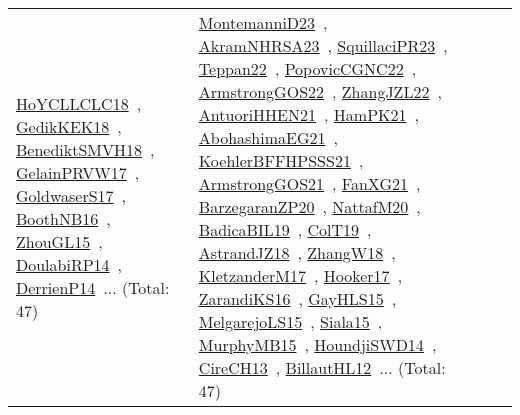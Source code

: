 {\begin{longtable}{lp{3cm}>{\raggedright\arraybackslash}p{6cm}>{\raggedright\arraybackslash}p{6cm}>{\raggedright\arraybackslash}p{8cm}}
\href{papers/HoYCLLCLC18.pdf}{HoYCLLCLC18}~\cite{HoYCLLCLC18}, \href{articles/GedikKEK18.pdf}{GedikKEK18}~\cite{GedikKEK18}, \href{papers/BenediktSMVH18.pdf}{BenediktSMVH18}~\cite{BenediktSMVH18}, \href{papers/GelainPRVW17.pdf}{GelainPRVW17}~\cite{GelainPRVW17}, \href{papers/GoldwaserS17.pdf}{GoldwaserS17}~\cite{GoldwaserS17}, \href{papers/BoothNB16.pdf}{BoothNB16}~\cite{BoothNB16}, \href{papers/ZhouGL15.pdf}{ZhouGL15}~\cite{ZhouGL15}, \href{papers/DoulabiRP14.pdf}{DoulabiRP14}~\cite{DoulabiRP14}, \href{papers/DerrienP14.pdf}{DerrienP14}~\cite{DerrienP14}... (Total: 47) & \href{articles/MontemanniD23.pdf}{MontemanniD23}~\cite{MontemanniD23}, \href{articles/AkramNHRSA23.pdf}{AkramNHRSA23}~\cite{AkramNHRSA23}, \href{papers/SquillaciPR23.pdf}{SquillaciPR23}~\cite{SquillaciPR23}, \href{papers/Teppan22.pdf}{Teppan22}~\cite{Teppan22}, \href{papers/PopovicCGNC22.pdf}{PopovicCGNC22}~\cite{PopovicCGNC22}, \href{papers/ArmstrongGOS22.pdf}{ArmstrongGOS22}~\cite{ArmstrongGOS22}, \href{papers/ZhangJZL22.pdf}{ZhangJZL22}~\cite{ZhangJZL22}, \href{papers/AntuoriHHEN21.pdf}{AntuoriHHEN21}~\cite{AntuoriHHEN21}, \href{articles/HamPK21.pdf}{HamPK21}~\cite{HamPK21}, \href{articles/AbohashimaEG21.pdf}{AbohashimaEG21}~\cite{AbohashimaEG21}, \href{articles/KoehlerBFFHPSSS21.pdf}{KoehlerBFFHPSSS21}~\cite{KoehlerBFFHPSSS21}, \href{papers/ArmstrongGOS21.pdf}{ArmstrongGOS21}~\cite{ArmstrongGOS21}, \href{articles/FanXG21.pdf}{FanXG21}~\cite{FanXG21}, \href{papers/BarzegaranZP20.pdf}{BarzegaranZP20}~\cite{BarzegaranZP20}, \href{papers/NattafM20.pdf}{NattafM20}~\cite{NattafM20}, \href{papers/BadicaBIL19.pdf}{BadicaBIL19}~\cite{BadicaBIL19}, \href{papers/ColT19.pdf}{ColT19}~\cite{ColT19}, \href{papers/AstrandJZ18.pdf}{AstrandJZ18}~\cite{AstrandJZ18}, \href{articles/ZhangW18.pdf}{ZhangW18}~\cite{ZhangW18}, \href{papers/KletzanderM17.pdf}{KletzanderM17}~\cite{KletzanderM17}, \href{papers/Hooker17.pdf}{Hooker17}~\cite{Hooker17}, \href{articles/ZarandiKS16.pdf}{ZarandiKS16}~\cite{ZarandiKS16}, \href{papers/GayHLS15.pdf}{GayHLS15}~\cite{GayHLS15}, \href{papers/MelgarejoLS15.pdf}{MelgarejoLS15}~\cite{MelgarejoLS15}, \href{articles/Siala15.pdf}{Siala15}~\cite{Siala15}, \href{papers/MurphyMB15.pdf}{MurphyMB15}~\cite{MurphyMB15}, \href{papers/HoundjiSWD14.pdf}{HoundjiSWD14}~\cite{HoundjiSWD14}, \href{papers/CireCH13.pdf}{CireCH13}~\cite{CireCH13}, \href{papers/BillautHL12.pdf}{BillautHL12}~\cite{BillautHL12}... (Total: 47)\\

\end{longtable}}
